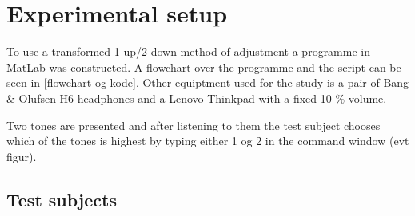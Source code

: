\section*{Experimental setup}
To use a transformed 1-up/2-down method of adjustment a programme in MatLab was constructed. A flowchart over the programme and the script can be seen in \autoref{flowchart og kode}. Other equiptment used for the study is a pair of Bang $\&$ Olufsen H6 headphones and a Lenovo Thinkpad with a fixed 10 \% volume.

Two tones are presented and after listening to them the test subject chooses which of the tones is highest by typing either 1 og 2 in the command window (evt figur).

\subsection*{Test subjects}